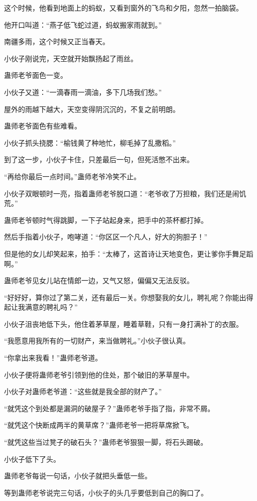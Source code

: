 \begin{this_body}
这个时候，他看到地面上的蚂蚁，又看到窗外的飞鸟和夕阳，忽然一拍脑袋。

他开口叫道：“燕子低飞蛇过道，蚂蚁搬家雨就到。”

南疆多雨，这个时候又正当春天。

小伙子刚说完，天空就开始飘扬起了雨丝。

蛊师老爷面色一变。

小伙子又道：“一滴春雨一滴油，多下几场我们愁。”

屋外的雨越下越大，天空变得阴沉沉的，不复之前明朗。

蛊师老爷面色有些难看。

小伙子抓头挠腮：“榆钱黄了种地忙，柳毛掉了乱撒稻。”

到了这一步，小伙子卡住，只差最后一句，但死活憋不出来。

“再给你最后一点时间。”蛊师老爷冷笑不止。

小伙子双眼顿时一亮，指着蛊师老爷脱口道：“老爷收了万担粮，我们还是闹饥荒。”

蛊师老爷顿时气得跳脚，一下子站起身来，把手中的茶杯都打掉。

然后手指着小伙子，咆哮道：“你区区一个凡人，好大的狗胆子！”

但是他的女儿却笑起来，拍手：“太棒了，这首诗让天地变色，更让爹你手舞足蹈啊。”

蛊师老爷见女儿站在情郎一边，又气又怒，偏偏又无法反驳。

“好好好，算你过了第二关，还有最后一关。你想娶我的女儿，聘礼呢？你能出得起让我满意的聘礼吗？”

小伙子沮丧地低下头，他住着茅草屋，睡着草鞋，只有一身打满补丁的衣服。

“我愿意用我所有的一切财产，来当做聘礼。”小伙子很认真。

“你拿出来我看！”蛊师老爷道。

小伙子便将蛊师老爷引领到他的住处，那个破旧的茅草屋中。

小伙子对蛊师老爷道：“这些就是我全部的财产了。”

“就凭这个到处都是漏洞的破屋子？”蛊师老爷手指了指，非常不屑。

“就凭这个快断成两半的黄草席？”蛊师老爷一把将草席掀飞。

“就凭这些当过凳子的破石头？”蛊师老爷狠狠一脚，将石头踢破。

小伙子低下了头。

蛊师老爷每说一句话，小伙子就把头垂低一些。

等到蛊师老爷说完三句话，小伙子的头几乎要低到自己的胸口了。


\end{this_body}
